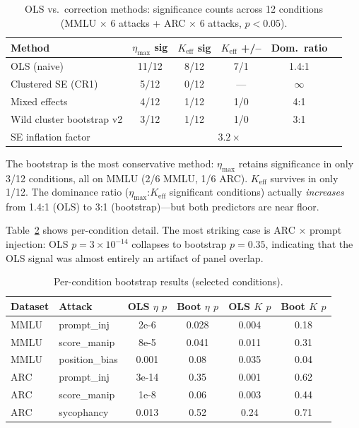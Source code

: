 \documentclass[11pt]{article}
\begin{document}
\begin{table}[h]
\centering
\caption{OLS vs.\ correction methods: significance counts across 12 conditions (MMLU $\times$ 6 attacks + ARC $\times$ 6 attacks, $p < 0.05$).}
\label{tab:ols_vs_correction}
\small
\begin{tabular}{lccccc}
\toprule
Method & $\eta_{\max}$ sig & $K_{\text{eff}}$ sig & $K_{\text{eff}}$ +/-- & Dom.\ ratio \\
\midrule
OLS (naive) & 11/12 & 8/12 & 7/1 & 1.4:1 \\
Clustered SE (CR1) & 5/12 & 0/12 & --- & $\infty$ \\
Mixed effects & 4/12 & 1/12 & 1/0 & 4:1 \\
Wild cluster bootstrap v2 & 3/12 & 1/12 & 1/0 & 3:1 \\
\midrule
SE inflation factor & \multicolumn{4}{c}{$3.2\times$} \\
\bottomrule
\end{tabular}
\end{table}

The bootstrap is the most conservative method: $\eta_{\max}$ retains significance in only 3/12 conditions, all on MMLU (2/6 MMLU, 1/6 ARC). $K_{\text{eff}}$ survives in only 1/12. The dominance ratio ($\eta_{\max}$:$K_{\text{eff}}$ significant conditions) actually \emph{increases} from 1.4:1 (OLS) to 3:1 (bootstrap)---but both predictors are near floor.

Table~\ref{tab:per_condition} shows per-condition detail. The most striking case is ARC $\times$ prompt injection: OLS $p = 3 \times 10^{-14}$ collapses to bootstrap $p = 0.35$, indicating that the OLS signal was almost entirely an artifact of panel overlap.

\begin{table}[h]
\centering
\caption{Per-condition bootstrap results (selected conditions).}
\label{tab:per_condition}
\small
\begin{tabular}{llcccc}
\toprule
Dataset & Attack & OLS $\eta$ $p$ & Boot $\eta$ $p$ & OLS $K$ $p$ & Boot $K$ $p$ \\
\midrule
MMLU & prompt\_inj & 2e-6 & 0.028 & 0.004 & 0.18 \\
MMLU & score\_manip & 8e-5 & 0.041 & 0.011 & 0.31 \\
MMLU & position\_bias & 0.001 & 0.08 & 0.035 & 0.04 \\
ARC & prompt\_inj & 3e-14 & 0.35 & 0.001 & 0.62 \\
ARC & score\_manip & 1e-8 & 0.06 & 0.003 & 0.44 \\
ARC & sycophancy & 0.013 & 0.52 & 0.24 & 0.71 \\
\bottomrule
\end{tabular}
\end{table}
\end{document}
